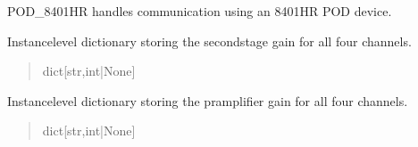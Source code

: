\documentclass[letterpaper,10pt,english]{sphinxmanual}
\begin{document}
\begin{fulllineitems}
\sphinxAtStartPar
POD\_8401HR handles communication using an 8401\sphinxhyphen{}HR POD device.

\begin{fulllineitems}
\label{\detokenize{Morelia.Devices:Morelia.Devices.PodDevice_8401HR.Pod8401HR._ssGain}}
\pysigstartsignatures
{}
\pysigstopsignatures
\sphinxAtStartPar
Instance\sphinxhyphen{}level dictionary storing the second\sphinxhyphen{}stage gain for all             four channels.
\begin{quote}\begin{description}
\sphinxAtStartPar
dict{[}str,int|None{]}

\end{description}\end{quote}

\end{fulllineitems}


\begin{fulllineitems}
\label{\detokenize{Morelia.Devices:Morelia.Devices.PodDevice_8401HR.Pod8401HR._preampGain}}
\pysigstartsignatures
{}
\pysigstopsignatures
\sphinxAtStartPar
Instance\sphinxhyphen{}level dictionary storing the pramplifier gain for             all four channels.
\begin{quote}\begin{description}
\sphinxAtStartPar
dict{[}str,int|None{]}

\end{description}\end{quote}

\end{fulllineitems}



\end{fulllineitems}
\end{document}
